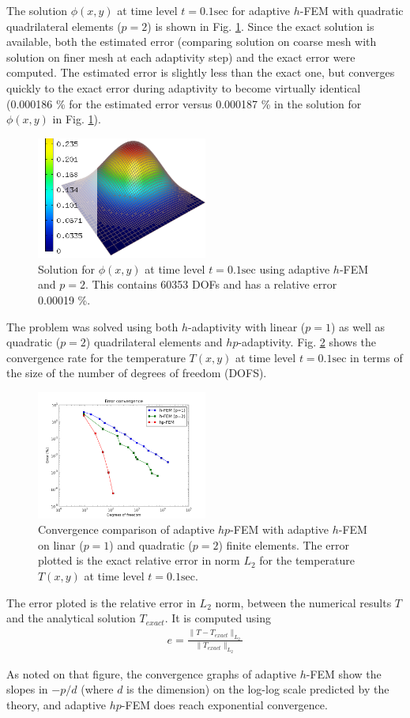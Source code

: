 The solution $\phi(x,y)$ at time level $t=0.1 \mbox{sec}$ for adaptive $h$-FEM with quadratic quadrilateral elements ($p=2$) is shown in Fig. \ref{sol_temp}.  Since the exact solution is available, both the estimated error (comparing solution on coarse mesh with solution on finer mesh at each adaptivity step) and the exact error were computed.  The estimated error is slightly less than the exact one, but converges quickly to the exact error during adaptivity to become virtually identical (0.000186 \% for the estimated error versus 0.000187 \% in the solution for $\phi(x,y)$ in Fig. \ref{sol_temp}).
\begin{figure}
  \includegraphics[width=0.5\textwidth]{figures/solution_T}
  \caption{Solution for $\phi(x,y)$ at time level $t=0.1 \mbox{sec}$ using adaptive $h$-FEM and $p=2$.  This contains 60353 DOFs and has a relative error 0.00019 \%.}
  \label{sol_temp}
\end{figure}

The problem was solved using both $h$-adaptivity with linear ($p=1$) as well as quadratic ($p=2$) quadrilateral elements and $hp$-adaptivity.  Fig. \ref{err_conv} shows the convergence rate for the temperature $T(x,y)$ at time level $t=0.1 \mbox{sec}$ in terms of the size of the number of degrees of freedom (DOFS).
\begin{figure}
  \includegraphics[width=0.5\textwidth]{figures/exact_err_conv}
  \caption{Convergence comparison of adaptive $hp$-FEM with adaptive $h$-FEM on linar ($p=1$) and quadratic ($p=2$) finite elements.  The error plotted is the exact relative error in norm $L_2$ for the temperature $T(x,y)$ at time level $t=0.1 \mbox{sec}$.}
  \label{err_conv}
\end{figure}

The error ploted is the relative error in $L_2$ norm, between the numerical results $T$ and the analytical solution $T_{exact}$.  It is computed using
\begin{align}
  e = \frac{ \|T-T_{exact}\|_{L_2} }{ \|T_{exact}\|_{L_2} }
\end{align}

As noted on that figure, the convergence graphs of adaptive $h$-FEM show the slopes in $-p/d$ (where $d$ is the dimension) on the log-log scale predicted by the theory, and adaptive $hp$-FEM does reach exponential convergence.
